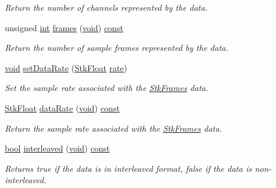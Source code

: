 \begin{DoxyCompactItemize}
\begin{DoxyCompactList}\small\item\em Return the number of channels represented by the data. \end{DoxyCompactList}\item 
unsigned \hyperlink{xmltok_8h_a5a0d4a5641ce434f1d23533f2b2e6653}{int} \hyperlink{class_nyq_1_1_stk_frames_a4afa798ea440ac443b2be9b9a8cde8fc}{frames} (\hyperlink{sound_8c_ae35f5844602719cf66324f4de2a658b3}{void}) \hyperlink{getopt1_8c_a2c212835823e3c54a8ab6d95c652660e}{const} 
\begin{DoxyCompactList}\small\item\em Return the number of sample frames represented by the data. \end{DoxyCompactList}\item 
\hyperlink{sound_8c_ae35f5844602719cf66324f4de2a658b3}{void} \hyperlink{class_nyq_1_1_stk_frames_a0d93f4714205d6f168e0f25479426c6e}{set\+Data\+Rate} (\hyperlink{namespace_nyq_a044fa20a706520a617bbbf458a7db7e4}{Stk\+Float} \hyperlink{seqread_8c_ad89d3fac2deab7a9cf6cfc8d15341b85}{rate})
\begin{DoxyCompactList}\small\item\em Set the sample rate associated with the \hyperlink{class_nyq_1_1_stk_frames}{Stk\+Frames} data. \end{DoxyCompactList}\item 
\hyperlink{namespace_nyq_a044fa20a706520a617bbbf458a7db7e4}{Stk\+Float} \hyperlink{class_nyq_1_1_stk_frames_a415b2e285f49917d882319ce6d454bf5}{data\+Rate} (\hyperlink{sound_8c_ae35f5844602719cf66324f4de2a658b3}{void}) \hyperlink{getopt1_8c_a2c212835823e3c54a8ab6d95c652660e}{const} 
\begin{DoxyCompactList}\small\item\em Return the sample rate associated with the \hyperlink{class_nyq_1_1_stk_frames}{Stk\+Frames} data. \end{DoxyCompactList}\item 
\hyperlink{mac_2config_2i386_2lib-src_2libsoxr_2soxr-config_8h_abb452686968e48b67397da5f97445f5b}{bool} \hyperlink{class_nyq_1_1_stk_frames_ad741aa2fcd3ac59b07e3a497663dfae8}{interleaved} (\hyperlink{sound_8c_ae35f5844602719cf66324f4de2a658b3}{void}) \hyperlink{getopt1_8c_a2c212835823e3c54a8ab6d95c652660e}{const} 
\begin{DoxyCompactList}\small\item\em Returns {\ttfamily true} if the data is in interleaved format, {\ttfamily false} if the data is non-\/interleaved. \end{DoxyCompactList}\item 

\end{DoxyCompactItemize}
